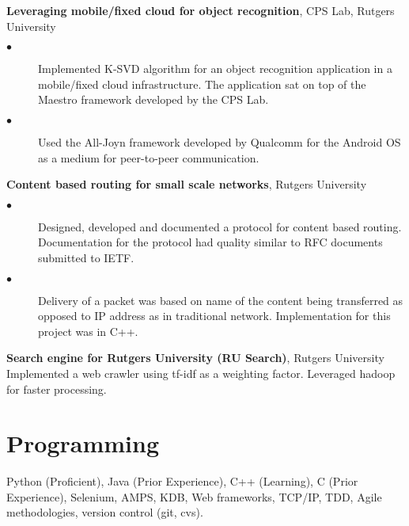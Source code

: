 \documentclass[margin,line]{res}
\begin{document}
\begin{resume}
    \textbf{Leveraging mobile/fixed cloud for object recognition}, CPS Lab, Rutgers University \vspace{2mm}\vspace{1mm}%
    \begin{description}
     \item[$\bullet$] Implemented K-SVD algorithm for an object recognition application in a mobile/fixed cloud infrastructure. The application sat on top of the Maestro framework developed by the CPS Lab.
     \item[$\bullet$] Used the All-Joyn framework developed by Qualcomm for the Android OS as a medium for peer-to-peer communication.
	\end{description}
    
    \textbf{Content based routing for small scale networks}, Rutgers University \vspace{2mm}\vspace{1mm}%
    \begin{description}
     \item[$\bullet$] Designed, developed and documented a protocol for content based routing. Documentation for the protocol had quality similar to RFC documents submitted to IETF.
     \item[$\bullet$] Delivery of a packet was based on name of the content being transferred as opposed to IP address as in traditional network. Implementation for this project was in C++.
	\end{description}
    
    \textbf{Search engine for Rutgers University (RU Search)}, Rutgers University \vspace{2mm}\vspace{1mm}\\
    Implemented a web crawler using tf-idf as a weighting factor. Leveraged hadoop for faster processing.
    
    \section{\mysidestyle Programming} 

    Python (Proficient), Java (Prior Experience), C++ (Learning), C (Prior Experience), Selenium, AMPS, KDB,
    Web frameworks, TCP/IP, TDD, Agile methodologies, version control (git, cvs).


\end{resume}
\end{document}
